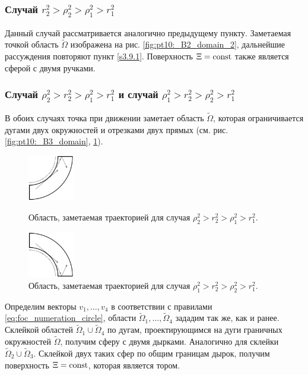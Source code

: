 \subsubsection{Случай  $r_2^2 > \rho_2^2 > \rho_1^2 > r_1^2$}\label{s3.9.2}
Данный случай рассматривается аналогично предыдущему пункту. Заметаемая точкой область $\widetilde{\Omega}$ изображена на рис. \ref{fig:pt10:_B2_domain_2}, дальнейшие рассуждения повторяют пункт \ref{s3.9.1}. Поверхность $\Xi = \mathrm{const}$ также является сферой с двумя ручками.

\subsubsection{Случай  $\rho_2^2 > r_2^2 > \rho_1^2 > r_1^2$ и случай $\rho_1^2 > r_2^2 > \rho_2^2 > r_1^2$}\label{s3.9.3}
В обоих случаях  точка при движении заметает область $\widetilde{\Omega}$, которая ограничивается дугами двух окружностей и отрезками двух прямых (см. рис. \ref{fig:pt10:_B3_domain}, \ref{fig:pt10:_B4_domain}).
\begin{figure}[!htb]
\centering
\includegraphics[width=2cm]{images/section3_circular/atoms/sect3_B3_domain.pdf}
    \caption{Область, заметаемая траекторией для случая $\rho_2^2 > r_2^2 > \rho_1^2 > r_1^2$.}
    \label{fig:pt10:_B3_domain}
\endminipage\hfill
{}
\centering
\includegraphics[width=2cm]{images/section3_circular/atoms/sect3_B4_domain.pdf}
    \caption{Область, заметаемая траекторией для случая $\rho_1^2 > r_2^2 > \rho_2^2 > r_1^2$.}
        \label{fig:pt10:_B4_domain}
\endminipage\hfill
\end{figure}

Определим векторы $v_1, \ldots, v_4$ в соответствии с правилами \eqref{eq:foc_numeration_circle}, области $\widetilde{\Omega}_1, \ldots, \widetilde{\Omega}_4$ зададим так же, как и ранее.
Склейкой областей $\widetilde{\Omega}_1 \cup \widetilde{\Omega}_4$ по дугам, проектирующимся на дуги граничных окружностей $\widetilde{\Omega}$, получим сферу с двумя дырками. Аналогично для склейки $\widetilde{\Omega}_2 \cup \widetilde{\Omega}_3$. Склейкой двух таких сфер по общим границам дырок, получим поверхность $\Xi = \mathrm{const}$, которая является тором.


